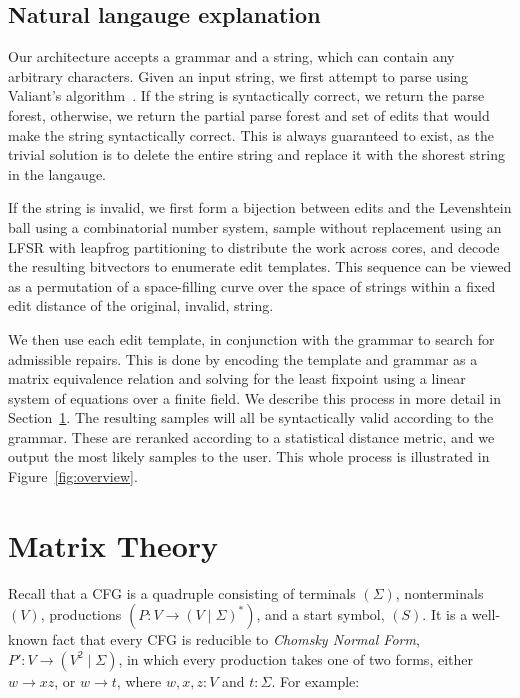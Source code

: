 \documentclass[sigplan,review,anonymous,acmsmall]{acmart}\settopmatter{printfolios=false,printccs=false,printacmref=false}
\begin{document}
\subsection{Natural langauge explanation}

Our architecture accepts a grammar and a string, which can contain any arbitrary characters. Given an input string, we first attempt to parse using Valiant's algorithm~\cite{valiant1979completeness}. If the string is syntactically correct, we return the parse forest, otherwise, we return the partial parse forest and set of edits that would make the string syntactically correct. This is always guaranteed to exist, as the trivial solution is to delete the entire string and replace it with the shorest string in the langauge.

If the string is invalid, we first form a bijection between edits and the Levenshtein ball using a combinatorial number system, sample without replacement using an LFSR with leapfrog partitioning to distribute the work across cores, and decode the resulting bitvectors to enumerate edit templates. This sequence can be viewed as a permutation of a space-filling curve over the space of strings within a fixed edit distance of the original, invalid, string.

We then use each edit template, in conjunction with the grammar to search for admissible repairs. This is done by encoding the template and grammar as a matrix equivalence relation and solving for the least fixpoint using a linear system of equations over a finite field. We describe this process in more detail in Section~\ref{sec:matrix}. The resulting samples will all be syntactically valid according to the grammar. These are reranked according to a statistical distance metric, and we output the most likely samples to the user. This whole process is illustrated in Figure~\ref{fig:overview}.


\section{Matrix Theory}\label{sec:matrix}

Recall that a CFG is a quadruple consisting of terminals $(\Sigma)$, nonterminals $(V)$, productions $(P\colon V \rightarrow (V \mid \Sigma)^*)$, and a start symbol, $(S)$. It is a well-known fact that every CFG is reducible to \textit{Chomsky Normal Form}, $P'\colon V \rightarrow (V^2 \mid \Sigma)$, in which every production takes one of two forms, either $w \rightarrow xz$, or $w \rightarrow t$, where $w, x, z: V$ and $t: \Sigma$. For example:\vspace{-3pt}
\end{document}
